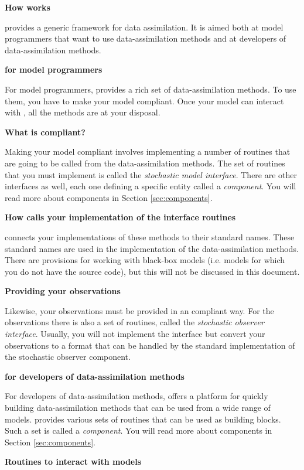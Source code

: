 \textbf{How \oda works}

\oda provides a generic framework for data assimilation. It is aimed both at model programmers that want to use data-assimilation methods and at developers of data-assimilation methods.

\textbf{\oda for model programmers}

For model programmers, \oda provides a rich set of data-assimilation methods. To use them, you have to make your model \oda compliant. Once your model can interact with \oda, all the \oda methods are at your disposal.

\textbf{What is \oda compliant?}

Making your model \oda compliant involves implementing a number of routines that are going to be called from the data-assimilation methods. The set of routines that you must implement is called the \emph{stochastic model interface}. There are other interfaces as well, each one defining a specific entity called a \emph{component}. You will read more about components in Section \ref{sec:components}.

\textbf{How \oda calls your implementation of the interface routines}

\oda connects your implementations of these methods to their standard names. These standard names are used in the implementation of the data-assimilation methods. There are provisions for working with black-box models (i.e. models for which you do not have the source code), but this will not be discussed in this document.

\textbf{Providing your observations}

Likewise, your observations must be provided in an \oda compliant way. For the observations there is also a set of routines, called the \emph{stochastic observer interface}. Usually, you will not implement the interface but convert your observations to a format that can be handled by the standard \oda implementation of the stochastic observer component.

\textbf{\oda for developers of data-assimilation methods}

For developers of data-assimilation methods, \oda offers a platform for quickly building data-assimilation methods that can be used from a wide range of models. \oda provides various sets of routines that can be used as building blocks. Such a set is called a \emph{component}. You will read more about components in Section \ref{sec:components}.

\textbf{Routines to interact with models}


